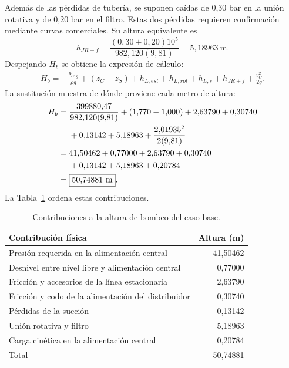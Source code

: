 Además de las pérdidas de tubería, se suponen caídas de 0,30 bar en la
unión rotativa y de 0,20 bar en el filtro. Estas dos pérdidas requieren
confirmación mediante curvas comerciales. Su altura equivalente es
\begin{equation}
 h_{JR+f}=
 \frac{(0{,}30+0{,}20)10^5}{982{,}120(9{,}81)}
 =5{,}18963\ \mathrm{m}.
 \label{eq:man-asp-accesorios}
\end{equation}
Despejando $H_b$ se obtiene la expresión de cálculo:
\begin{align}
 H_b={}&\frac{p_{C,g}}{\rho g}+(z_C-z_S)
 +h_{L,est}+h_{L,rot}+h_{L,s}+h_{JR+f}+\frac{v_C^2}{2g}.
 \label{eq:man-asp-hb}
\end{align}
La sustitución muestra de dónde proviene cada metro de altura:
\begin{align}
 H_b={}&\frac{399880{,}47}{982{,}120(9{,}81)}+(1{,}770-1{,}000)
 +2{,}63790+0{,}30740\notag\\
 &+0{,}13142+5{,}18963+\frac{2{,}01935^2}{2(9{,}81)}\notag\\
 ={}&41{,}50462+0{,}77000+2{,}63790+0{,}30740\notag\\
 &+0{,}13142+5{,}18963+0{,}20784\notag\\
 ={}&\boxed{50{,}74881\ \mathrm{m}}.
 \label{eq:man-asp-hbnum}
\end{align}
La Tabla~\ref{tab:man-asp-altura} ordena estas contribuciones.

\begin{table}[htbp]
\centering\small
\caption{Contribuciones a la altura de bombeo del caso base.}
\label{tab:man-asp-altura}
\begin{tabularx}{\linewidth}{@{}Xr@{}}
\toprule Contribución física & Altura (m)\\\midrule
Presión requerida en la alimentación central & 41,50462\\
Desnivel entre nivel libre y alimentación central & 0,77000\\
Fricción y accesorios de la línea estacionaria & 2,63790\\
Fricción y codo de la alimentación del distribuidor & 0,30740\\
Pérdidas de la succión & 0,13142\\
Unión rotativa y filtro & 5,18963\\
Carga cinética en la alimentación central & 0,20784\\\midrule
Total & 50,74881\\\bottomrule
\end{tabularx}
\end{table}

